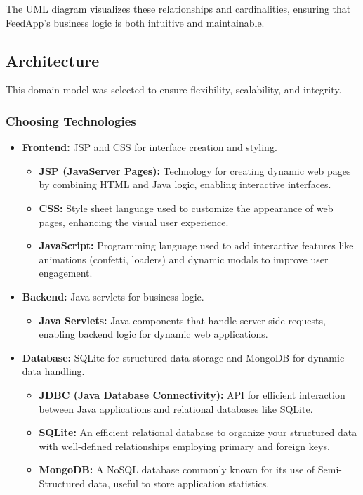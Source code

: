 The UML diagram visualizes these relationships and cardinalities, ensuring that FeedApp's business logic is both intuitive and maintainable.


\subsection{Architecture}

This domain model was selected to ensure flexibility, scalability, and integrity.

\subsubsection{Choosing Technologies}

\begin{itemize}
    \item \textbf{Frontend:} JSP and CSS for interface creation and styling.
    \begin{itemize}
        \item \textbf{JSP (JavaServer Pages):} Technology for creating dynamic web pages by combining HTML and Java logic, enabling interactive interfaces.
        \item \textbf{CSS:} Style sheet language used to customize the appearance of web pages, enhancing the visual user experience.
        \item \textbf{JavaScript:} Programming language used to add interactive features like animations (confetti, loaders) and dynamic modals to improve user engagement.
    \end{itemize}

    \item \textbf{Backend:} Java servlets for business logic.
    \begin{itemize}
        \item \textbf{Java Servlets:} Java components that handle server-side requests, enabling backend logic for dynamic web applications.
    \end{itemize}

    \item \textbf{Database:} SQLite for structured data storage and MongoDB for dynamic data handling.
    \begin{itemize}
        \item \textbf{JDBC (Java Database Connectivity):} API for efficient interaction between Java applications and relational databases like SQLite.
        \item \textbf{SQLite:} An efficient relational database to organize your structured data with well-defined relationships employing primary and foreign keys.
        \item \textbf{MongoDB:} A NoSQL database commonly known for its use of Semi-Structured data, useful to store application statistics.
    \end{itemize}


\end{itemize}
